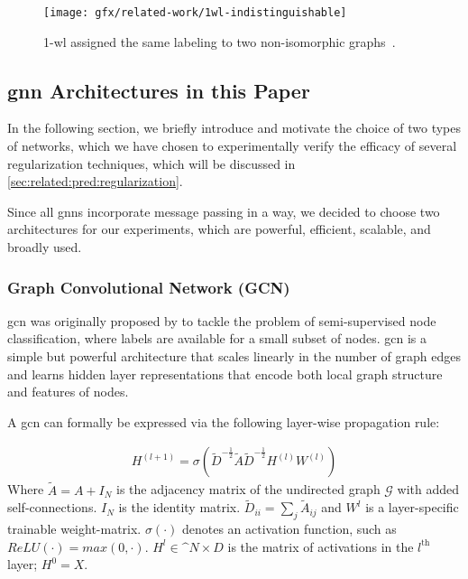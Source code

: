 \begin{figure}[H]
    \centering
    \texttt{[image: gfx/related-work/1wl-indistinguishable]}
    \caption{1-\ac{wl} assigned the same labeling to two non-isomorphic graphs~\cite{Liu2022}.}\label{fig:related:1-wl-indistinguishable}
\end{figure}

\subsection{\acs*{gnn} Architectures in this Paper}
\label{sec:related:architectures}
In the following section, we briefly introduce and motivate the choice of two types of networks, which we have chosen to experimentally verify the efficacy of several regularization techniques, which will be discussed in \cref{sec:related:pred:regularization}.

Since all \acp{gnn} incorporate message passing in a way, we decided to choose two architectures for our experiments, which are powerful, efficient, scalable, and broadly used.
\subsubsection{Graph Convolutional Network (GCN)}
\label{sec:related:architectures:gcn}
\Acf{gcn} was originally proposed by \citet{Kipf2017} to tackle the problem of semi-supervised node classification, where labels are available for a small subset of nodes.
\Ac{gcn} is a simple but powerful architecture that scales linearly in the number of graph edges and learns hidden layer representations that encode both local graph structure and features of nodes.

A \ac{gcn} can formally be expressed via the following layer-wise propagation rule:

\begin{align*}
    H^{(l+1)} = \sigma (\tilde{D}^{-\frac{1}{2}}\tilde{A}\tilde{D}^{-\frac{1}{2}} H^{(l)}W^{(l)})
\end{align*}
Where $\tilde{A} = A + I_{N}$ is the adjacency matrix of the undirected graph $\mathcal{G}$
with added self-connections. $I_{N}$ is the identity matrix. $\tilde{D}_{ii} = \sum_{j}\tilde{A}_{ij}$ and $W^{l}$ is a layer-specific trainable weight-matrix. $\sigma(\cdot)$ denotes an activation function, such as $ReLU(\cdot) = max(0, \cdot)$. $ H^{l}\in  \mathbb^{N \times D}$ is the matrix of activations in the
$l^{\mathrm{th}}$ layer; $H^{0}= X$.

